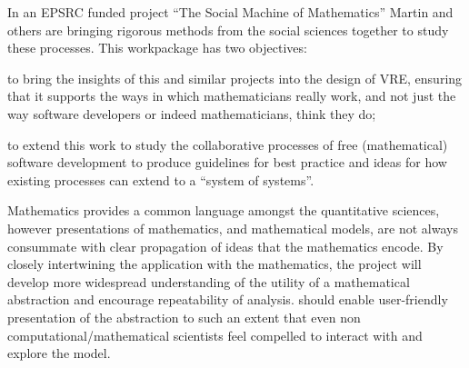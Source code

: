 \begin{workpackage}[id=social-aspects,wphases=0-48,
  title=Social Aspects,
  lead=UO,
  UORM=53,USHRM=8, USORM=6]
\begin{wpobjectives}
In an EPSRC funded project ``The Social Machine of Mathematics''
Martin and others are bringing rigorous methods from the social 
sciences together to study these processes. This workpackage has two
objectives: \begin{compactitem}
\item to bring the insights of this and similar projects into the
  design of \TheProject VRE, ensuring that it supports the ways in
  which mathematicians really work, and not just the way software
  developers or indeed mathematicians, think they do;
\item to extend this work to study the collaborative processes of free
  (mathematical) software development to produce guidelines for best
  practice and ideas for how existing processes can extend to a
  ``system of systems''.
\item {}
\end{compactitem} 







Mathematics provides a common language amongst the quantitative
sciences, however presentations of mathematics, and mathematical
models, are not always consummate with clear propagation of ideas that
the mathematics encode. By closely intertwining the application with
the mathematics, the project will develop more widespread
understanding of the utility of a mathematical abstraction and
encourage repeatability of analysis. \TheProject should enable
user-friendly presentation of the abstraction to such an extent that
even non computational/mathematical scientists feel compelled to
interact with and explore the model.




\end{wpobjectives}
\end{workpackage}
